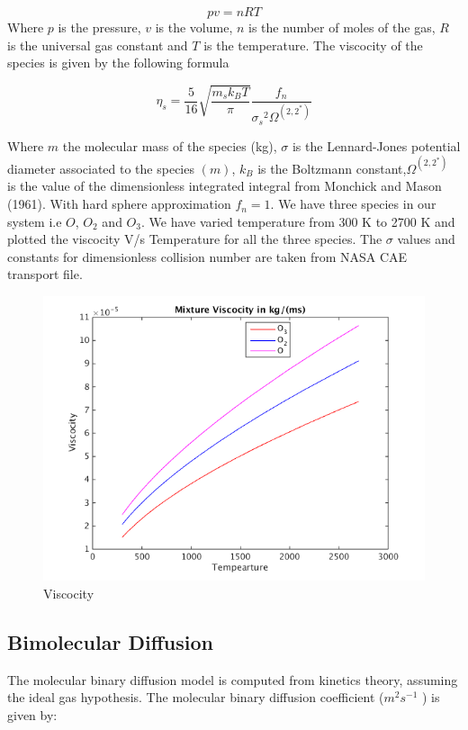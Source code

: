 $$pv = nRT$$ Where $p$ is the pressure, $v$ is the volume, $n$ is the number of moles of the gas, $R$ is the universal gas constant and $T$ is the temperature. The viscocity of the species is given by the following formula

$$\eta_s = \frac{5}{16}\sqrt{\frac{m_s k_B T}{\pi}}\frac{f_n}{{\sigma_s}^2   \Omega^{(2,2^*)}}$$

\noindent Where  $m$ the molecular mass of the species (kg), $\sigma$ is the Lennard-Jones potential diameter associated
to the species $(m)$, $k_B$ is the Boltzmann constant,$\Omega^{(2,2^*)}$ is the value of the dimensionless integrated integral from Monchick
and Mason (1961). With hard sphere approximation $f_n = 1$. We have three species in our system i.e $O$, $O_2$ and $O_3$. We have varied temperature from 300 K to 2700 K and plotted the viscocity V/s Temperature for all the three species. The $\sigma$ values and constants for dimensionless collision number are taken from NASA CAE transport file. 
\begin{figure}[h!]
  \centering
  \includegraphics[scale=0.5]{figs/viscocity model.png}
   \caption{Viscocity}
\end{figure}

\subsection{Bimolecular Diffusion}
\noindent The molecular binary diffusion model is
computed from kinetics theory, assuming the ideal gas hypothesis. The molecular binary diffusion coefficient ($m^2 s^{-1}$ ) is given by:

